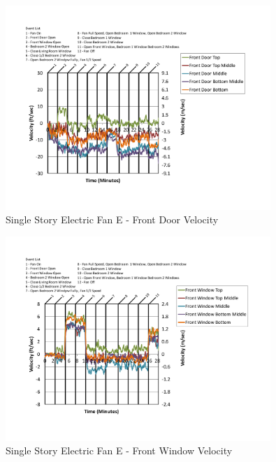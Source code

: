 \documentclass{article}
\begin{document}
\begin{appendices}
	\begin{figure}[H]
		\centering
		\includegraphics[height=3.05in,trim=0.67in 1.1in 0.67in 0.8in,clip=true]{0_Images/Results_Charts/ColdFlow/Single_Story/Electric/E/Front_Door_Velocity.pdf}
		\caption{Single Story Electric Fan E - Front Door Velocity}
	\end{figure}
 

	\begin{figure}[H]
		\centering
		\includegraphics[height=3.05in,trim=0.67in 1.1in 0.67in 0.8in,clip=true]{0_Images/Results_Charts/ColdFlow/Single_Story/Electric/E/Front_Window_Velocity.pdf}
		\caption{Single Story Electric Fan E - Front Window Velocity}
	\end{figure}
 
	\clearpage


\end{appendices}
\end{document}
